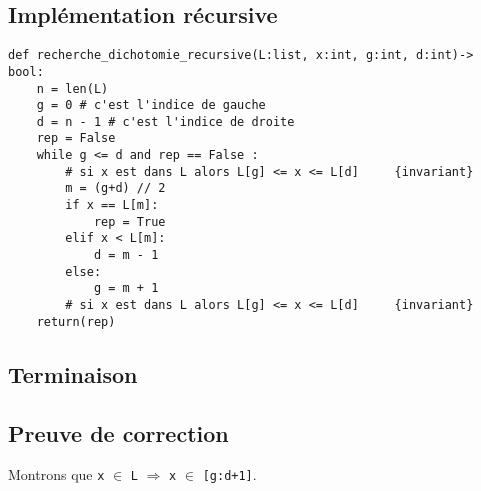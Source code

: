 \subsection{Implémentation récursive}
\begin{lstlisting}
def recherche_dichotomie_recursive(L:list, x:int, g:int, d:int)-> bool:
    n = len(L)
    g = 0 # c'est l'indice de gauche
    d = n - 1 # c'est l'indice de droite
    rep = False
    while g <= d and rep == False :
        # si x est dans L alors L[g] <= x <= L[d]     {invariant}
        m = (g+d) // 2 
        if x == L[m]:
            rep = True
        elif x < L[m]:
            d = m - 1
        else:
            g = m + 1
        # si x est dans L alors L[g] <= x <= L[d]     {invariant}
    return(rep)
\end{lstlisting} 


\subsection{Terminaison}

\subsection{Preuve de correction}

Montrons que \lstinline{x} $\in$ \lstinline{L} $\Rightarrow$ \lstinline{x} $\in$ \lstinline{[g:d+1]}.

